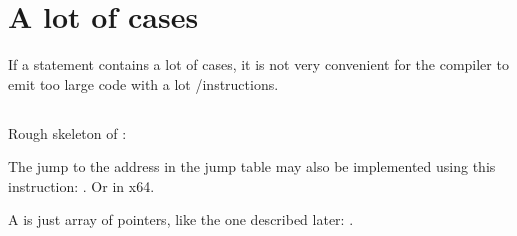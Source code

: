 \section{A lot of cases}

If a  statement contains a lot of cases, it is not very convenient for the compiler to emit too large code
with a lot \JE/\JNE instructions.







\subsection{\Conclusion{}}

Rough skeleton of :



The jump to the address in the jump table may also be implemented using this instruction: .
Or  in x64.

A  is just array of pointers, like the one described later: .

